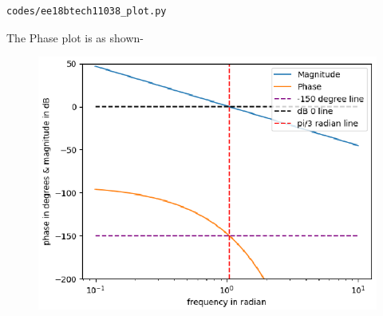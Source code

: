 \begin{enumerate}[label=\thesubsection.\arabic*.,ref=\thesubsection.\theenumi]
\begin{lstlisting}
codes/ee18btech11038_plot.py
\end{lstlisting}
The Phase plot is as shown-
\begin{figure}[!h]
  \includegraphics[width=\columnwidth]{./figs/ee18btech11038/ee18btech11038_graph.eps}
  \caption{}
  \label{fig:ee18btech11038_graph}
\end{figure}

\end{enumerate}
